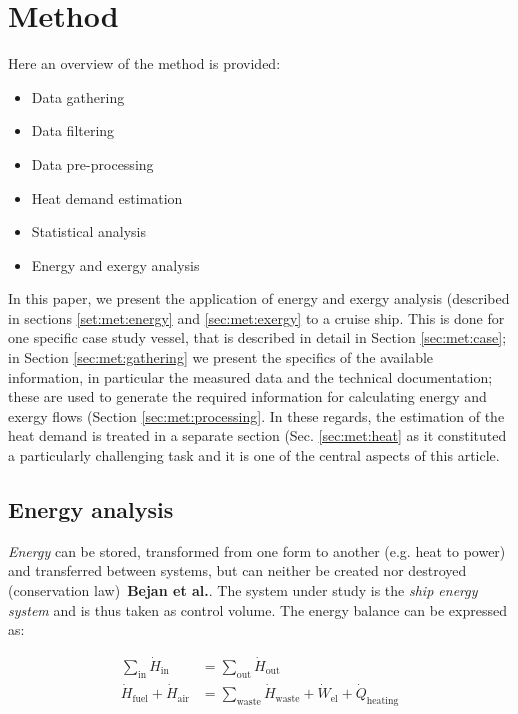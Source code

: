 \documentclass[preprint,12pt]{elsarticle}
\begin{document}
\section{Method} \label{sec:method}

Here an overview of the method is provided: 
\begin{itemize}
	\item Data gathering
	\item Data filtering
	\item Data pre-processing
	\item Heat demand estimation
	\item Statistical analysis
	\item Energy and exergy analysis
\end{itemize}

In this paper, we present the application of energy and exergy analysis (described in sections \ref{set:met:energy} and \ref{sec:met:exergy} to a cruise ship. This is done for one specific case study vessel, that is described in detail in Section \ref{sec:met:case}; in Section \ref{sec:met:gathering} we present the specifics of the available information, in particular the measured data and the technical documentation; these are used to generate the required information for calculating energy and exergy flows (Section \ref{sec:met:processing}. In these regards, the estimation of the heat demand is treated in a separate section (Sec. \ref{sec:met:heat} as it constituted a particularly challenging task and it is one of the central aspects of this article. 

\subsection{Energy analysis}

\emph{Energy} can be stored, transformed from one form to another (e.g. heat to power) and transferred between systems, but can neither be created nor destroyed (conservation law)~\textbf{Bejan et al.}. The system under study is the \emph{ship energy system} and is thus taken as control volume. The energy balance can be expressed as:

\begin{align}
	\sum_{\mathrm{in}} \dot{H}_{\mathrm{in}} &= \sum_{\mathrm{out}} \dot{H}_{\mathrm{out}} \\
	\dot{H}_{\mathrm{fuel}} + \dot{H}_{\mathrm{air}} &= \sum_{{\mathrm{waste}}}\dot{H}_{{\mathrm{waste}}}+\dot{W}_{\mathrm{el}}+\dot{Q}_{\mathrm{heating}}
\end{align}
\end{document}
